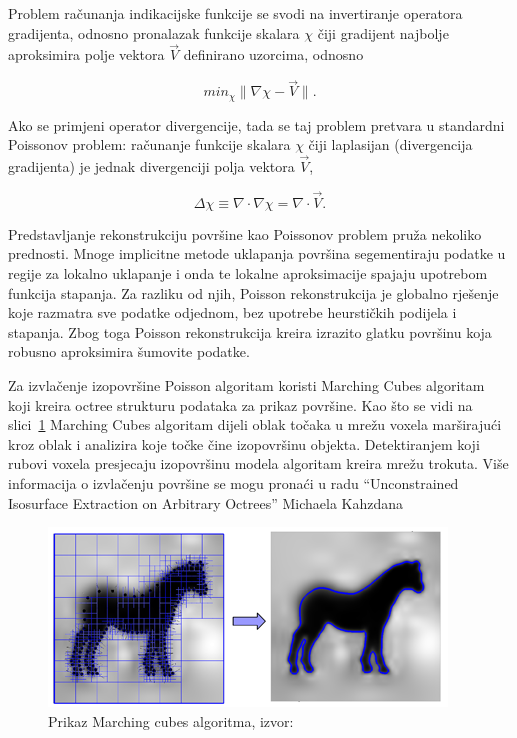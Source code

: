 Problem računanja indikacijske funkcije se svodi na invertiranje
operatora gradijenta, odnosno pronalazak funkcije skalara \(\chi\) čiji
gradijent najbolje aproksimira polje vektora \(\vec{V}\) definirano
uzorcima, odnosno 

\begin{equation*}
min_\chi \|\nabla\chi - \vec{V}\|.
\end{equation*}

Ako se primjeni operator divergencije, tada se taj problem pretvara u
standardni Poissonov problem: računanje funkcije skalara \(\chi\) čiji
laplasijan (divergencija gradijenta) je jednak divergenciji polja
vektora \(\vec{V}\),

\begin{equation*}
\Delta \chi \equiv \nabla \cdot \nabla\chi = \nabla \cdot \vec{V}.
\end{equation*}

Predstavljanje rekonstrukciju površine kao Poissonov problem pruža
nekoliko prednosti. Mnoge implicitne metode uklapanja površina
segementiraju podatke u regije za lokalno uklapanje i onda te lokalne
aproksimacije spajaju upotrebom funkcija stapanja. Za razliku od njih,
Poisson rekonstrukcija je globalno rješenje koje razmatra sve podatke
odjednom, bez upotrebe heurstičkih podijela i stapanja. Zbog toga
Poisson rekonstrukcija kreira izrazito glatku površinu koja robusno
aproksimira šumovite podatke.  

Za izvlačenje izopovršine Poisson algoritam koristi Marching Cubes
algoritam~\cite{Lorensen87marchingcubes} koji kreira octree strukturu
podataka za prikaz površine.  Kao što se vidi na
slici~\ref{fig:poisson-marching-cubes.png} Marching Cubes algoritam
dijeli oblak točaka u mrežu voxela marširajući kroz oblak i analizira
koje točke čine izopovršinu objekta.  Detektiranjem koji rubovi voxela
presjecaju izopovršinu modela algoritam kreira mrežu trokuta. Više
informacija o izvlačenju površine se mogu pronaći u radu “Unconstrained
Isosurface Extraction on Arbitrary Octrees” Michaela
Kahzdana~\cite{Kazhdan:2007}

\begin{figure}[h]
\centering
\includegraphics[scale=0.8]{figures/poisson-marching-cubes.png}
\caption[]{Prikaz Marching cubes algoritma, izvor:~\cite{Kazhdan:2007}}
\label{fig:poisson-marching-cubes.png}
\end{figure}

